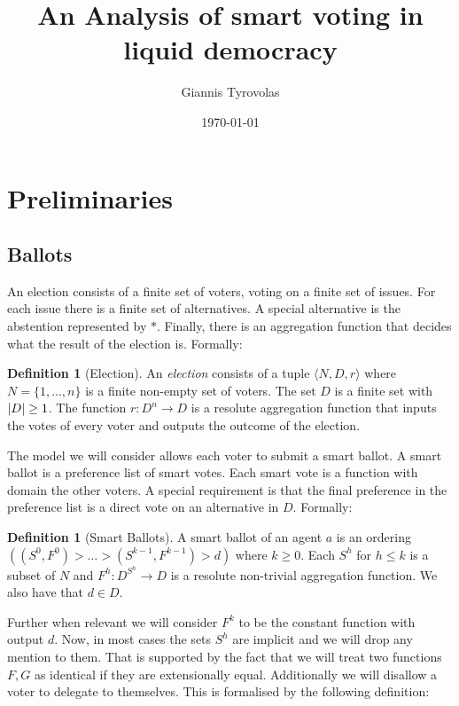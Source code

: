 \documentclass[11pt,a4paper, titlepage]{article}
\title{An Analysis of smart voting in liquid democracy}
\author{Giannis Tyrovolas}
\date{\today}
\DeclarePairedDelimiter\abs{\lvert}{\rvert}
\theoremstyle{definition}
\newtheorem{definition}[theorem]{Definition}
\begin{document}
\maketitle

\tableofcontents

\newpage

\section{Preliminaries}

\subsection{Ballots}


An election consists of a finite set of voters, voting on a finite set of issues. For each issue there is a finite set of alternatives. A special alternative is the abstention represented by $*$. Finally, there is an aggregation function that decides what the result of the election is. Formally:

\begin{definition}[Election]
    An \emph{election} consists of a tuple $\langle N, D, r\rangle $ where $N = \{1,..., n\} $ is a finite non-empty set of voters. The set $D$ is a finite set with $\abs{D} \geq 1$. The function $r \colon D^n \longrightarrow D$ is a resolute aggregation function that inputs the votes of every voter and outputs the outcome of the election.
\end{definition}

The model we will consider allows each voter to submit a smart ballot. A smart ballot is a preference list of smart votes. Each smart vote is a function with domain the other voters. A special requirement is that the final preference in the preference list is a direct vote on an alternative in $D$. Formally:

\begin{definition}[Smart Ballots]
    A smart ballot of an agent $a$ is an ordering $( (S^0, F^0) > \ldots > (S^{k-1}, F^{k-1}) > d)$ where $k \geq 0$. Each $S^h$ for $h \leq k$ is a subset of $N$ and $F^h \colon D^{S^h} \longrightarrow D$ is a resolute non-trivial aggregation function. We also have that $d \in D$.   
\end{definition}

Further when relevant we will consider $F^{k}$ to be the constant function with output $d$. Now, in most cases the sets $S^h$ are implicit and we will drop any mention to them. That is supported by the fact that we will treat two functions $F, G$ as identical if they are extensionally equal. Additionally we will disallow a voter to delegate to themselves. This is formalised by the following definition:
\end{document}
